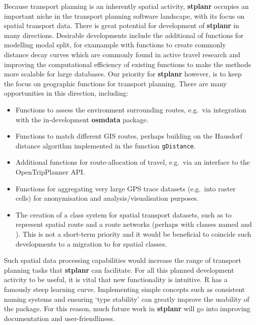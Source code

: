 Because transport planning is an inherently spatial activity,
\textbf{stplanr} occupies an important niche in the transport planning
software landscape, with its focus on spatial transport data. There is
great potential for development of \textbf{stplanr} in many directions.
Desirable developments include the additional of functions for modelling
modal split, for examample with functions to create commonly distance
decay curves which are commonly found in active travel research
\citep{martinez_new_2013} and improving the computational efficiency of
existing functions to make the methods more scalable for large
databases. Our priority for \textbf{stplanr} however, is to keep the
focus on geographic functions for transport planning. There are many
opportunities in this direction, including:

\begin{itemize}
\tightlist
\item
  Functions to assess the environment surrounding routes, e.g.~via
  integration with the in-development \textbf{osmdata} package.
\item
  Functions to match different GIS routes, perhaps building on the
  Hausdorf distance algorithm implemented in the 
  function \texttt{gDistance}.
\item
  Additional functions for route-allocation of travel, e.g.~via an
  interface to the OpenTripPlanner API.
\item
  Functions for aggregating very large GPS trace datasets (e.g.~into
  raster cells) for anonymisation and analysis/visualisation purposes.
\item
  The creation of a class system for spatial transport datasets, such as
  to represent spatial route and a route networks (perhaps with classes
  named  and ). This is not a short-term priority
  and it would be beneficial to coincide such developments to a
  migration to  for spatial classes.
\end{itemize}

Such spatial data processing capabilities would increase the range of
transport planning tasks that \textbf{stplanr} can facilitate. For all
this planned development activity to be useful, it is vital that new
functionality is intuitive. R has a famously steep learning curve.
Implementing simple concepts such as consistent naming systems
\citep{baath_state_2012} and ensuring `type stability' can greatly
improve the usability of the package. For this reason, much future work
in \textbf{stplanr} will go into improving documentation and
user-friendliness.


